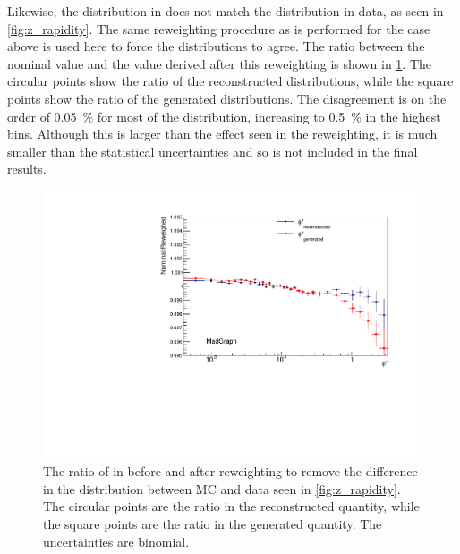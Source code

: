 Likewise, the \Z \rapidity distribution in \MADGRAPH does not match the
distribution in data, as seen in \cref{fig:z_rapidity}. The same reweighting
procedure as is performed for the \mee case above is used here to force the
distributions to agree. The ratio between the nominal \phistar value and the
value derived after this reweighting is shown in
\cref{fig:z_rapidity_reweighted}. The circular points show the ratio of the
reconstructed \phistar distributions, while the square points show the ratio of
the generated \phistar distributions. The disagreement is on the order of
\SI{0.05}{\percent} for most of the distribution, increasing to
\SI{0.5}{\percent} in the highest \phistar bins. Although this is larger than
the effect seen in the \mee reweighting, it is much smaller than the
statistical uncertainties and so is not included in the final results.

\begin{figure}[!htbp]
    \centering
    \includegraphics[width=\textwidth]{figures/ZY_reweighed.pdf}
    \caption[
        The ratio of \phistar in \MADGRAPH before and after reweighting to
        remove the difference in the \rapidity distribution between MC and data.
    ]{
        The ratio of \phistar in \MADGRAPH before and after reweighting to
        remove the difference in the \rapidity distribution between MC and data
        seen in \cref{fig:z_rapidity}. The circular points are the ratio in
        the reconstructed quantity, while the square points are the ratio in
        the generated quantity. The uncertainties are binomial.
    }
    \label{fig:z_rapidity_reweighted}
\end{figure}

